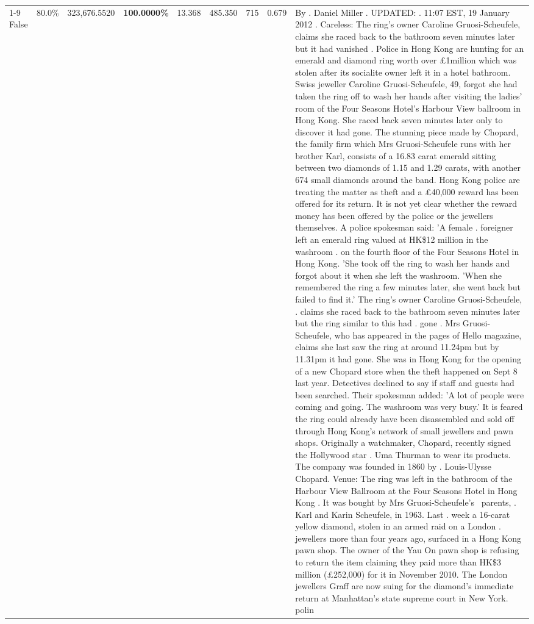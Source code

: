 \begin{table}[H]
\begin{tabular}{lllrlllll}
\cline{1-9}
False & 80.0\% & 323,676.5520 & \bfseries \color{red} 100.0000\% & 13.368 & 485.350 & 715 & 0.679 & By . Daniel Miller . UPDATED: . 11:07 EST, 19 January 2012 . Careless: The ring's owner Caroline Gruosi-Scheufele, claims she raced back to the bathroom seven minutes later but it had vanished . Police in Hong Kong are hunting for an emerald and diamond ring worth over £1million which was stolen after its socialite owner left it in a hotel bathroom. Swiss jeweller Caroline Gruosi-Scheufele, 49, forgot she had taken the ring off to wash her hands after visiting the ladies' room of the Four Seasons Hotel's Harbour View ballroom in Hong Kong. She raced back seven minutes later only to discover it had gone. The stunning piece made by Chopard, the family firm which Mrs Gruosi-Scheufele runs with her brother Karl, consists of a 16.83 carat emerald sitting between two diamonds of 1.15 and 1.29 carats, with another 674 small diamonds around the band. Hong Kong police are treating the matter as theft and a £40,000 reward has been offered for its return. It is not yet clear whether the reward money has been offered by the police or the jewellers themselves. A police spokesman said: 'A female . foreigner left an emerald ring valued at HK\$12 million in the washroom . on the fourth floor of the Four Seasons Hotel in Hong Kong. 'She took off the ring to wash her hands and forgot about it when she left the washroom. 'When she remembered the ring a few minutes later, she went back but failed to find it.' The ring's owner Caroline Gruosi-Scheufele, . claims she raced back to the bathroom seven minutes later but the ring similar to this had . gone . Mrs Gruosi-Scheufele, who has appeared in the pages of Hello magazine, claims she last saw the ring at around 11.24pm but by 11.31pm it had gone. She was in Hong Kong for the opening of a new Chopard store when the theft happened on Sept 8 last year. Detectives declined to say if staff and guests had been searched. Their spokesman added: 'A lot of people were coming and going. The washroom was very busy.' It is feared the ring could already have been disassembled and sold off through Hong Kong's network of small jewellers and pawn shops. Originally a watchmaker, Chopard, recently signed the Hollywood star . Uma Thurman to wear its products. The company was founded in 1860 by . Louis-Ulysse Chopard. Venue: The ring was left in the bathroom of the Harbour View Ballroom at the Four Seasons Hotel in Hong Kong . It was bought by Mrs Gruosi-Scheufele's  parents, . Karl and Karin Scheufele, in 1963. Last . week a 16-carat yellow diamond, stolen in an armed raid on a London . jewellers more than four years ago, surfaced in a Hong Kong pawn shop. The owner of the Yau On pawn shop is refusing to return the item claiming they paid more than HK\$3 million (£252,000) for it in November 2010. The London jewellers Graff are now suing for the diamond’s immediate return at Manhattan’s state supreme court in New York. polin \\

\end{tabular}
\end{table}
